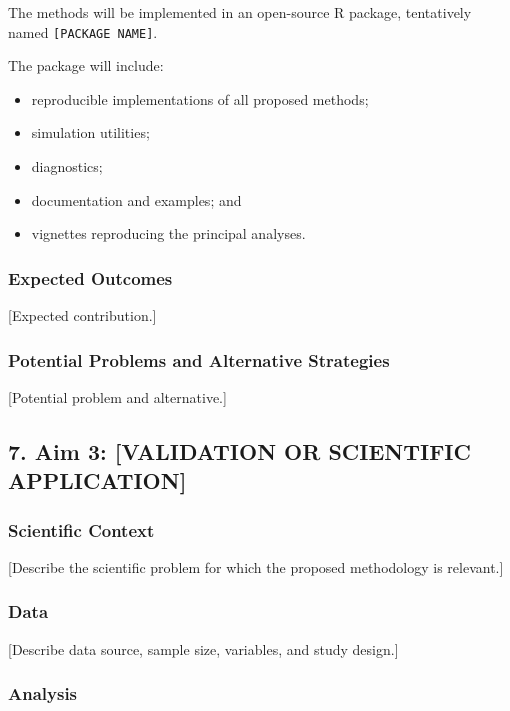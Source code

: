 \documentclass[
  11pt,
  letterpaper,
]{article}
\providecommand{\tightlist}{%
  \setlength{\itemsep}{0pt}\setlength{\parskip}{0pt}}\usepackage{longtable,booktabs,array}
\begin{document}
The methods will be implemented in an open-source R package, tentatively
named \texttt{{[}PACKAGE\ NAME{]}}.

The package will include:

\begin{itemize}
\tightlist
\item
  reproducible implementations of all proposed methods;
\item
  simulation utilities;
\item
  diagnostics;
\item
  documentation and examples; and
\item
  vignettes reproducing the principal analyses.
\end{itemize}

\subsubsection{Expected Outcomes}\label{expected-outcomes-1}

{[}Expected contribution.{]}

\subsubsection{Potential Problems and Alternative
Strategies}\label{potential-problems-and-alternative-strategies-1}

{[}Potential problem and alternative.{]}

\subsection{7. Aim 3: {[}VALIDATION OR SCIENTIFIC
APPLICATION{]}}\label{aim-3-validation-or-scientific-application}

\subsubsection{Scientific Context}\label{scientific-context}

{[}Describe the scientific problem for which the proposed methodology is
relevant.{]}

\subsubsection{Data}\label{data}

{[}Describe data source, sample size, variables, and study design.{]}

\subsubsection{Analysis}\label{analysis}
\end{document}
